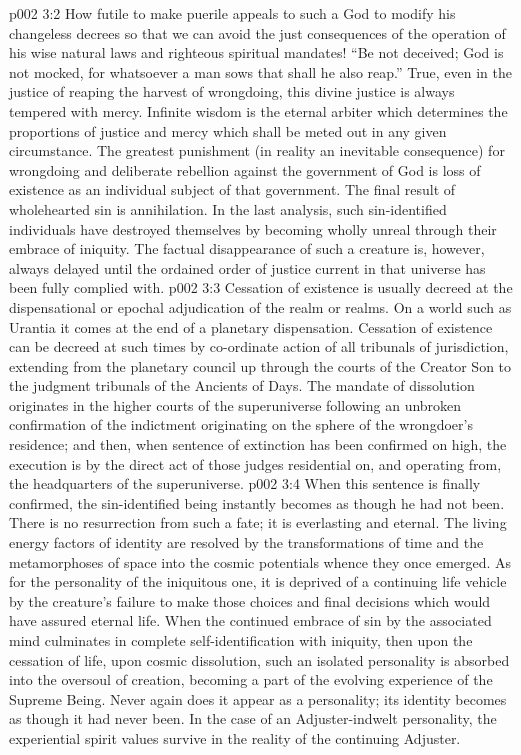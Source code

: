 \pc \vs p002 3:2 How futile to make puerile appeals to such a God to modify his changeless decrees so that we can avoid the just consequences of the operation of his wise natural laws and righteous spiritual mandates! “Be not deceived; God is not mocked, for whatsoever a man sows that shall he also reap.” True, even in the justice of reaping the harvest of wrongdoing, this divine justice is always tempered with mercy. Infinite wisdom is the eternal arbiter which determines the proportions of justice and mercy which shall be meted out in any given circumstance. The greatest punishment (in reality an inevitable consequence) for wrongdoing and deliberate rebellion against the government of God is loss of existence as an individual subject of that government. The final result of wholehearted sin is annihilation. In the last analysis, such sin\hyp{}identified individuals have destroyed themselves by becoming wholly unreal through their embrace of iniquity. The factual disappearance of such a creature is, however, always delayed until the ordained order of justice current in that universe has been fully complied with.
\vs p002 3:3 Cessation of existence is usually decreed at the dispensational or epochal adjudication of the realm or realms. On a world such as Urantia it comes at the end of a planetary dispensation. Cessation of existence can be decreed at such times by co\hyp{}ordinate action of all tribunals of jurisdiction, extending from the planetary council up through the courts of the Creator Son to the judgment tribunals of the Ancients of Days. The mandate of dissolution originates in the higher courts of the superuniverse following an unbroken confirmation of the indictment originating on the sphere of the wrongdoer’s residence; and then, when sentence of extinction has been confirmed on high, the execution is by the direct act of those judges residential on, and operating from, the headquarters of the superuniverse.
\vs p002 3:4 When this sentence is finally confirmed, the sin\hyp{}identified being instantly becomes as though he had not been. There is no resurrection from such a fate; it is everlasting and eternal. The living energy factors of identity are resolved by the transformations of time and the metamorphoses of space into the cosmic potentials whence they once emerged. As for the personality of the iniquitous one, it is deprived of a continuing life vehicle by the creature’s failure to make those choices and final decisions which would have assured eternal life. When the continued embrace of sin by the associated mind culminates in complete self\hyp{}identification with iniquity, then upon the cessation of life, upon cosmic dissolution, such an isolated personality is absorbed into the oversoul of creation, becoming a part of the evolving experience of the Supreme Being. Never again does it appear as a personality; its identity becomes as though it had never been. In the case of an Adjuster\hyp{}indwelt personality, the experiential spirit values survive in the reality of the continuing Adjuster.
